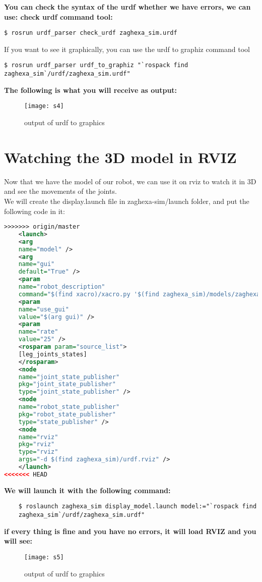 \textbf{You can check the syntax of the urdf whether we have errors, we can use:
check urdf command tool:}
\begin{lstlisting}[language=terCmd]
$ rosrun urdf_parser check_urdf zaghexa_sim.urdf
\end{lstlisting}

If you want to see it graphically, you can use the urdf to graphiz command tool
\begin{lstlisting}[language=terCmd]
$ rosrun urdf_parser urdf_to_graphiz "`rospack find zaghexa_sim`/urdf/zaghexa_sim.urdf"
\end{lstlisting}
\textbf{The following is what you will receive as output:}
\begin{figure}[hbt]
    \centering
    \texttt{[image: s4]}
    \caption{output of urdf to graphics}
    \label{figure :s4}
\end{figure}

\section{Watching the 3D model in RVIZ}
Now that we have the model of our robot, we can use it on rviz to watch it in 3D
and see the movements of the joints.\\
We will create the display.launch file in zaghexa-sim/launch folder,
and put the following code in it:
\begin{lstlisting}[language=XML]
>>>>>>> origin/master
	<launch>
	<arg
	name="model" />
	<arg
	name="gui"
	default="True" />
	<param
	name="robot_description"
	command="$(find xacro)/xacro.py '$(find zaghexa_sim)/models/zaghexa_model.xacro'" />
	<param
	name="use_gui"
	value="$(arg gui)" />
	<param
	name="rate"
	value="25" />
	<rosparam param="source_list">
	[leg_joints_states]
	</rosparam>
	<node
	name="joint_state_publisher"
	pkg="joint_state_publisher"
	type="joint_state_publisher" />
	<node
	name="robot_state_publisher"
	pkg="robot_state_publisher"
	type="state_publisher" />
	<node
	name="rviz"
	pkg="rviz"
	type="rviz"
	args="-d $(find zaghexa_sim)/urdf.rviz" />
	</launch>
<<<<<<< HEAD
	\end{lstlisting}	
	\textbf{We will launch it with the following command:}
	\begin{lstlisting}
	$ roslaunch zaghexa_sim display_model.launch model:="`rospack find
	zaghexa_sim`/urdf/zaghexa_sim.urdf"
	\end{lstlisting}
	\textbf{if every thing is fine and you have no errors, it will load RVIZ and you will see:}
	\begin{figure}[h]
		\centering
		\texttt{[image: s5]}
		\caption{output of urdf to graphics}
		\label{figure :s5}
	\end{figure}
